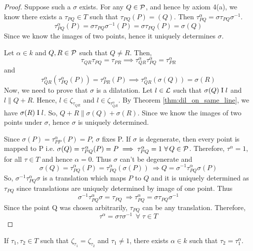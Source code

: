 \begin{proof}
    Suppose such a $\sigma$ exists. For any $Q \in \mathcal{P}$, and hence by axiom 4(a), we know there exists a $\tau_{PQ} \in T$ such that $\tau_{PQ}(P)=(Q)$. Then $\tau_{PQ}^\alpha = \sigma \tau_{PQ} \sigma^{-1}$.
    \[ 
    \tau_{PQ}^\alpha(P) = \sigma \tau_{PQ} \sigma^{-1}(P) = \sigma \tau_{PQ}(P) = \sigma (Q)
    \]
    Since we know the images of two points, hence it uniquely determines $\sigma$.

    \noindent
    Let $\alpha \in k$ and $Q, R \in \mathcal{P}$ such that $Q \neq R$. Then, 
    \[ \tau_{QR}\tau_{PQ}=\tau_{PR} \implies \tau_{QR}^\alpha\tau_{PQ}^\alpha=\tau_{PR}^\alpha \]
    and
    \[ \tau_{QR}^\alpha(\tau_{PQ}^\alpha (P))=\tau_{PR}^\alpha(P) \implies \tau_{QR}^\alpha(\sigma(Q))=\sigma(R) \]   
    Now, we need to prove that $\sigma$ is a dilatation. Let $l \in \mathcal{L}$ such that $\sigma(Q) \mathrel\text{I} l$ and $l \parallel Q+R$. Hence, $l \in \zeta_{\tau_{QR}}$ and $l \in \zeta_{\tau_{QR}^{\alpha}}$. By Theorem \ref{thm:dil_on_same_line}, we have $\sigma(R) \mathrel\text{I} l$. So, $Q+R \parallel \sigma(Q)+ \sigma(R)$.
    Since we know the images of two points under $\sigma$, hence $\sigma$ is uniquely determined.

    \vspace{1ex}

    Since $\sigma(P) = \tau_{PP}^\alpha(P)=P$, $\sigma$ fixes P. If $\sigma$ is degenerate, then every point is mapped to P i.e. $\sigma(Q) = \tau_{PQ}^{\alpha}(P) = P \implies \tau_{PQ}^{\alpha} = 1\ \forall\, Q \in \mathcal{P}$. Therefore, $\tau^\alpha = 1$, for all $\tau \in T$ and hence $\alpha=0$. Thus $\sigma$ can't be degenerate and
    \[
    \sigma(Q)=\tau_{PQ}^{\alpha}(P)= \tau_{PQ}^{\alpha}(\sigma(P)) \: \Rightarrow Q = \sigma^{-1}\tau_{PQ}^{\alpha}\sigma(P)
    \]
    So, $\sigma^{-1}\tau_{PQ}^{\alpha}\sigma$ is a translation which maps $P$ to $Q$ and it is uniquely determined as $\tau_{PQ}$ since translations are uniquely determined by image of one point. Thus
    \[
    \sigma^{-1}\tau_{PQ}^{\alpha}\sigma = \tau_{PQ} \: \Rightarrow \tau_{PQ}^{\alpha} = \sigma\tau_{PQ}\sigma^{-1}
    \]
    Since the point Q was chosen arbitrarily, $\tau_{PQ}$ can be any translation. Therefore,
    \[
    \tau^{\alpha} = \sigma\tau\sigma^{-1} \: \: \forall \; \tau \in T
    \]
\end{proof}

\begin{axiom}[4b]
    If $\tau_1, \tau_2 \in T$ such that $\zeta_{\tau_1} = \zeta_{\tau_2}$ and $\tau_1 \neq 1$, there exists $\alpha \in k$ such that $\tau_2 = \tau_1^\alpha$.
\end{axiom}

